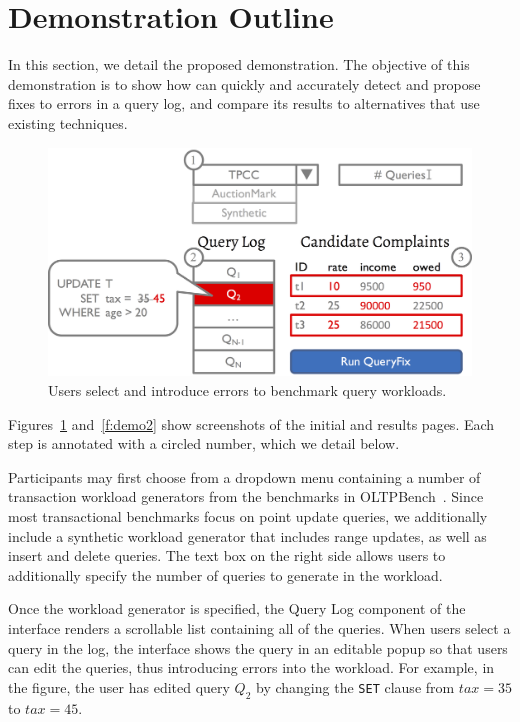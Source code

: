 \section{Demonstration Outline}
\label{sec:demo}

In this section, we detail the proposed demonstration. The objective
of this demonstration is to show how \sys can quickly and accurately detect 
and propose fixes to errors in a query log, and compare its results to alternatives
that use existing techniques.


\begin{figure}[h]
\centering
  \includegraphics[width = .75\columnwidth]{figures/demo1}
  \caption{Users select and introduce errors to benchmark query workloads.}
  \label{f:demo1} 
\end{figure}

Figures~\ref{f:demo1} and~\ref{f:demo2} show screenshots of the initial and results pages.
Each step is annotated with a circled number, which we detail below.

 Participants may first choose from a dropdown menu containing
a number of transaction workload generators from the benchmarks in OLTPBench~\cite{oltpbench}.
Since most transactional benchmarks focus on point update queries, we additionally include a 
synthetic workload generator that includes range updates, as well as insert and delete queries.
The text box on the right side allows users to additionally specify the number of queries to generate
in the workload.  

 Once the workload generator is specified, the Query Log component of the interface
renders a scrollable list containing all of the queries.  When users select a query in the log,
the interface shows the query in an editable popup so that users can edit the queries, thus introducing errors
into the workload.  For example, in the figure, the user has edited query $Q_2$ by changing the \texttt{SET}
clause from $tax = 35$ to $tax = 45$.


